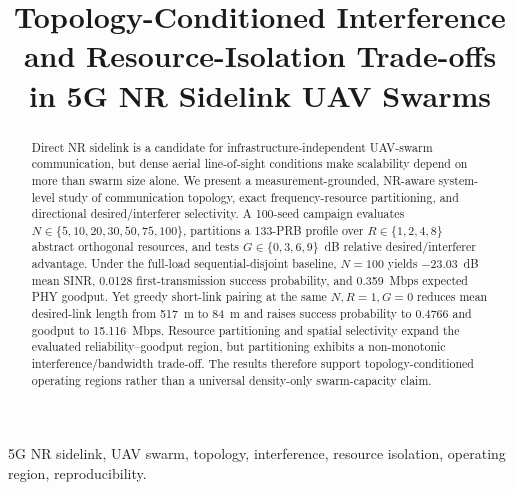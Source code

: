 \documentclass[conference]{IEEEtran}
\title{Topology-Conditioned Interference and Resource-Isolation Trade-offs in 5G NR Sidelink UAV Swarms}
\author{\IEEEauthorblockN{Panagiota Grosdouli}
\IEEEauthorblockA{Department of Electrical and Computer Engineering\\
Democritus University of Thrace\\
Xanthi, Greece}}
\begin{document}
\maketitle

\begin{abstract}
Direct NR sidelink is a candidate for infrastructure-independent UAV-swarm communication, but dense aerial line-of-sight conditions make scalability depend on more than swarm size alone. We present a measurement-grounded, NR-aware system-level study of communication topology, exact frequency-resource partitioning, and directional desired/interferer selectivity. A 100-seed campaign evaluates $N\in\{5,10,20,30,50,75,100\}$, partitions a 133-PRB profile over $R\in\{1,2,4,8\}$ abstract orthogonal resources, and tests $G\in\{0,3,6,9\}$~dB relative desired/interferer advantage. Under the full-load sequential-disjoint baseline, $N=100$ yields $-23.03$~dB mean SINR, 0.0128 first-transmission success probability, and 0.359~Mbps expected PHY goodput. Yet greedy short-link pairing at the same $N,R=1,G=0$ reduces mean desired-link length from 517~m to 84~m and raises success probability to 0.4766 and goodput to 15.116~Mbps. Resource partitioning and spatial selectivity expand the evaluated reliability--goodput region, but partitioning exhibits a non-monotonic interference/bandwidth trade-off. The results therefore support topology-conditioned operating regions rather than a universal density-only swarm-capacity claim.
\end{abstract}

\begin{IEEEkeywords}
5G NR sidelink, UAV swarm, topology, interference, resource isolation, operating region, reproducibility.
\end{IEEEkeywords}







\balance

\end{document}
